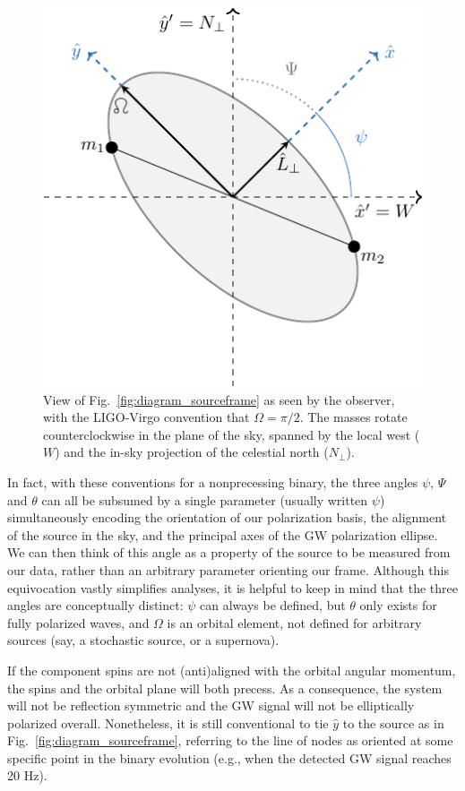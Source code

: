 \documentclass[aps,prd,twocolumn,superscriptaddress,preprintnumbers,floatfix,nofootinbib]{revtex4-2}
\begin{document}
\begin{figure}
\includegraphics[width=0.8\columnwidth]{diagram_skyview.pdf}
\caption{View of Fig.~\ref{fig:diagram_sourceframe} as seen by the observer, with the LIGO-Virgo convention that $\Omega=\pi/2$. The masses rotate counterclockwise in the plane of the sky, spanned by the local west ($W$) and the in-sky projection of the celestial north ($N_\perp$).
}
\label{fig:diagram_skyview}
\end{figure}

In fact, with these conventions for a nonprecessing binary, the three angles $\psi$, $\Psi$ and $\theta$ can all be subsumed by a single parameter (usually written $\psi$) simultaneously encoding the orientation of our polarization basis, the alignment of the source in the sky, and the principal axes of the GW polarization ellipse.
We can then think of this angle as a property of the source to be measured from our data, rather than an arbitrary parameter orienting our frame.
Although this equivocation vastly simplifies analyses, it is helpful to keep in mind that the three angles are conceptually distinct: $\psi$ can always be defined, but $\theta$ only exists for fully polarized waves, and $\Omega$ is an orbital element, not defined for arbitrary sources (say, a stochastic source, or a supernova).

If the component spins are not (anti)aligned with the orbital angular momentum, the spins and the orbital plane will both precess.
As a consequence, the system will not be reflection symmetric and the GW signal will not be elliptically polarized overall.
Nonetheless, it is still conventional to tie $\hat{y}$ to the source as in Fig.~\ref{fig:diagram_sourceframe}, referring to the line of nodes as oriented at some specific point in the binary evolution (e.g., when the detected GW signal reaches 20 Hz).
\end{document}

